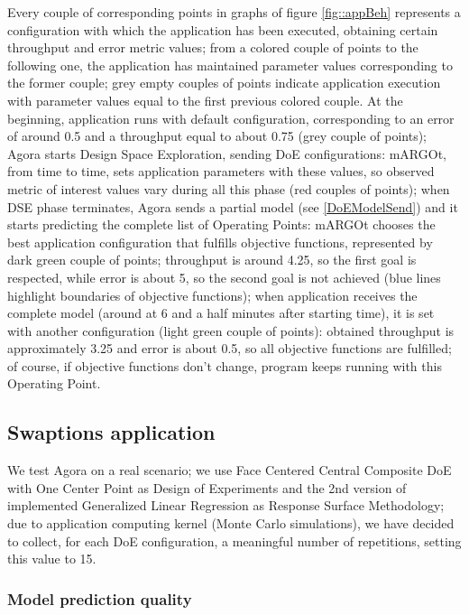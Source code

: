 Every couple of corresponding points in graphs of figure \ref{fig::appBeh} represents a configuration with which the application has been executed, obtaining certain throughput and error metric values; from a colored couple of points to the following one, the application has maintained parameter values corresponding to the former couple; grey empty couples of points indicate application execution with parameter values equal to the first previous colored couple. At the beginning, application runs with default configuration, corresponding to an error of around 0.5 and a throughput equal to about 0.75 (grey couple of points); Agora starts Design Space Exploration, sending DoE configurations: mARGOt, from time to time, sets application parameters with these values, so observed metric of interest values vary during all this phase (red couples of points); when DSE phase terminates, Agora sends a partial model (see \ref{DoEModelSend}) and it starts predicting the complete list of Operating Points: mARGOt chooses the best application configuration that fulfills objective functions, represented by dark green couple of points; throughput is around 4.25, so the first goal is respected, while error is about 5, so the second goal is not achieved (blue lines highlight boundaries of objective functions); when application receives the complete model (around at 6 and a half minutes after starting time), it is set with another configuration (light green couple of points): obtained throughput is approximately 3.25 and error is about 0.5, so all objective functions are fulfilled; of course, if objective functions don't change, program keeps running with this Operating Point.




\subsection{Swaptions application}

We test Agora on a real scenario; we use Face Centered Central Composite DoE with One Center Point as Design of Experiments and the 2nd version of implemented Generalized Linear Regression as Response Surface Methodology; due to application computing kernel (Monte Carlo simulations), we have decided to collect, for each DoE configuration, a meaningful number of repetitions, setting this value to 15.


\subsubsection{Model prediction quality}

